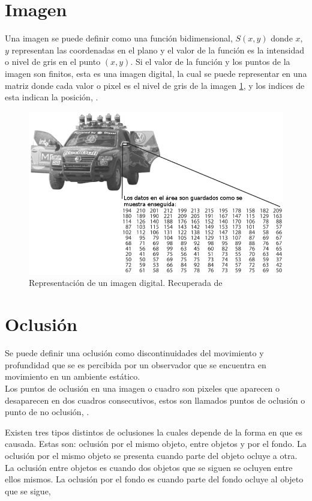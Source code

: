 \section{Imagen}\label{ImagenDef} 

Una imagen se puede definir como una función bidimensional, $S(x,y)$ donde $x$, $y$ representan las coordenadas en el plano y el valor de la función es la intensidad o nivel de gris en el punto $(x,y)$. 
Si el valor de la función y los puntos de la imagen son finitos, esta es una imagen digital, la cual se puede representar en una matriz donde cada valor o pixel es el nivel de gris de la imagen \ref{fig:image}, y los indices de esta indican la posición, \citep{Gonzalez2002}. 

\begin{figure}[h!]
\begin{center}
\includegraphics[scale=.50]{./Figures/image.png}
\end{center}
\caption{Representación de un imagen digital. Recuperada de \citep{Shin2013}}
\label{fig:image}
\end{figure}

\section{Oclusión}\label{OclusionDef} 

Se puede definir una oclusión como discontinuidades del movimiento y profundidad que se es percibida por un observador que se encuentra en movimiento en un ambiente estático.\\
Los puntos de oclusión en una imagen o cuadro son pixeles que aparecen o desaparecen en dos cuadros consecutivos, estos son llamados puntos de oclusión o punto de no oclusión, \citep{Silva2001}.  

Existen tres tipos distintos de oclusiones la cuales depende de la forma en que es causada. Estas son: oclusión por el mismo objeto, entre objetos y por el fondo. La oclusión por el mismo objeto se presenta cuando parte del objeto ocluye a otra. La oclusión entre objetos es cuando dos objetos que se siguen se ocluyen entre ellos mismos. La oclusión por el fondo es cuando parte del fondo ocluye al objeto que se sigue, \citep{YilmazA.JavedO.andShah2006}


\newpage
